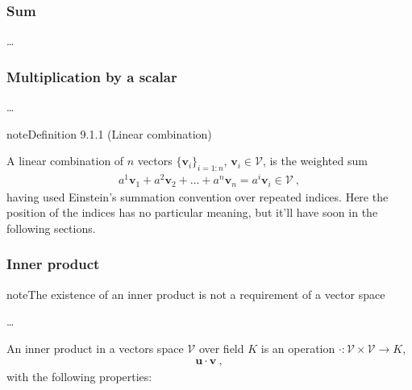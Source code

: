 \documentclass[letterpaper,10pt,english]{jupyterBook}
\begin{document}
\subsubsection{Sum}
\label{\detokenize{ch/tensor-algebra-calculus/algebra:sum}}
\sphinxAtStartPar
…


\subsubsection{Multiplication by a scalar}
\label{\detokenize{ch/tensor-algebra-calculus/algebra:multiplication-by-a-scalar}}
\sphinxAtStartPar
…
\label{ch/tensor-algebra-calculus/algebra:definition-0}
\begin{sphinxadmonition}{note}{Definition 9.1.1 (Linear combination)}



\sphinxAtStartPar
A linear combination of \(n\) vectors \(\{ \mathbf{v}_i \}_{i=1:n}\), \(\mathbf{v}_i \in \mathscr{V}\), is the weighted sum
\begin{equation*}
\begin{split}a^1 \mathbf{v}_1 + a^2 \mathbf{v}_2 + \dots + a^n \mathbf{v}_n = a^i \mathbf{v}_i \in \mathscr{V} \ ,\end{split}
\end{equation*}
\sphinxAtStartPar
having used Einstein’s summation convention over repeated indices. Here the position of the indices has no particular meaning, but it’ll have soon in the following sections.
\end{sphinxadmonition}




\subsubsection{Inner product}
\label{\detokenize{ch/tensor-algebra-calculus/algebra:inner-product}}
\begin{sphinxadmonition}{note}{The existence of an inner product is not a requirement of a vector space}

\sphinxAtStartPar
…
\end{sphinxadmonition}

\sphinxAtStartPar
An inner product in a vectors space \(\mathscr{V}\) over field \(K\) is an operation \(\cdot: \mathscr{V} \times \mathscr{V} \rightarrow K\),
\begin{equation*}
\begin{split}\mathbf{u} \cdot \mathbf{v} \ ,\end{split}
\end{equation*}
\sphinxAtStartPar
with the following properties: 
\end{document}
